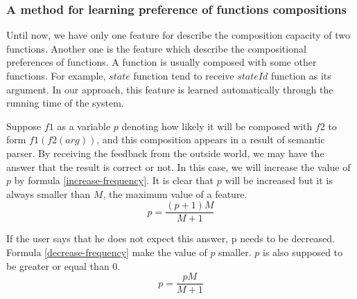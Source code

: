 \subsubsection{A method for learning preference of functions compositions}
Until now, we have only one feature for describe the composition capacity of two functions. Another one is the feature which describe the compositional preferences of functions. A function is usually composed with some other functions. For example, $state$ function tend to receive $stateId$ function as its argument. In our approach, this feature is learned automatically through the running time of the system. 

Suppose $f1$ as a variable $p$ denoting how likely it will be composed with $f2$ to form $f1(f2(arg))$, and this composition appears in a result of semantic parser. By receiving the feedback from the outside world, we may have the answer that the result is correct or not.
In this case, we will increase the value of $p$ by formula \ref{increase-frequency}. It is clear that $p$ will be increased but it is always smaller than $M$, the maximum value of a feature.
\begin{equation}
\label{increase-frequency}
p = \frac{(p + 1)M}{M+1}
\end{equation}

If the user says that he does not expect this answer, p needs to be decreased. Formula \ref{decrease-frequency} make the value of $p$ smaller. $p$ is also supposed to be greater or equal than $0$. 
\begin{equation}
\label{decrease-frequency}
p = \frac{p M}{M+1}
\end{equation}